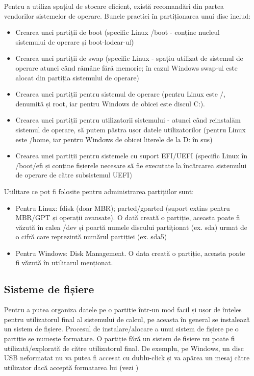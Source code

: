 Pentru a utiliza spațiul de stocare eficient, există recomandări din partea
vendorilor sistemelor de operare. Bunele practici în partiționarea unui disc
includ:

\begin{itemize}
	\item Crearea unei partiții de boot (specific Linux /boot - conține
		nucleul sistemului de operare și boot-lodear-ul)
	\item Crearea unei partiții de swap (specific Linux - spațiu utilizat de
		sistemul de operare atunci când rămâne fără memorie; în cazul
		Windows swap-ul este alocat din partiția sistemului de operare)
	\item Crearea unei partiții pentru sistemul de operare (pentru Linux
		este /, denumită și root, iar pentru Windows de obicei este
		discul C:).
	\item Crearea unei partiții pentru utilizatorii sistemului - atunci când
		reinstalăm sistemul de operare, să putem păstra ușor datele
		utilizatorilor (pentru Linux este /home, iar pentru Windows de
		obicei literele de la D: în sus)
	\item Crearea unei partiții pentru sistemele cu suport EFI/UEFI
		(specific Linux în /boot/efi și conține fișierele necesare să
		fie executate la încărcarea sistemului de operare de către
		subsistemul UEFI)
\end{itemize}

Utilitare ce pot fi folosite pentru administrarea partițiilor sunt:

\begin{itemize}
	\item Pentru Linux: fdisk (doar MBR); parted/gparted (suport extins
		pentru MBR/GPT și operații avansate). O dată creată o partiție,
		aceasta poate fi văzută în calea /dev și poartă numele discului
		partiționat (ex. sda) urmat de o cifră care reprezintă numărul
		partiției (ex. sda5)
	\item Pentru Windows: Disk Management. O data creată o partiție, aceasta
		poate fi văzută în utilitarul menționat.
\end{itemize}

\subsection{Sisteme de fișiere}
\label{sec:storage-fs}

Pentru a putea organiza datele pe o partiție într-un mod facil și ușor de
înțeles pentru utilizatorul final al sistemului de calcul, pe aceasta în general
se instalează un sistem de fișiere. Procesul de instalare/alocare a unui sistem
de fișiere pe o partiție se numește formatare. O partiție fără un sistem de
fișiere nu poate fi utilizată/explorată de către utilizatorul final. De exemplu,
pe Windows, un disc USB neformatat nu va putea fi accesat cu dublu-click și va
apărea un mesaj către utilizator dacă acceptă formatarea lui (vezi
)

